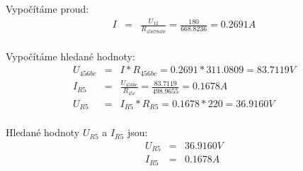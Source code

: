 Vypočítáme proud:
    \begin{eqnarray*}
        I &= & \frac{U_{12}}{R_{45678abc}} = \frac{180}{668.8236} = 0.2691 A\\
	\end{eqnarray*}

Vypočítáme hledané hodnoty:
    \begin{eqnarray*}
        U_{456bc} &= & I * R_{456bc} = 0.2691 * 311.0809 = 83.7119 V\\
        I_{R5} &= & \frac{U_{456bc}}{R_{45c}} = \frac{83.7119}{498.9655} = 0.1678 A\\
        U_{R5} &= & I_{R5} * R_{R5} = 0.1678 * 220 = 36.9160 V\\
	\end{eqnarray*}

Hledané hodnoty $U_{R5}$ a $I_{R5}$ jsou:
    \begin{eqnarray*}
        U_{R5} &= & 36.9160 V\\
        I_{R5} &= & 0.1678 A\\
	\end{eqnarray*}